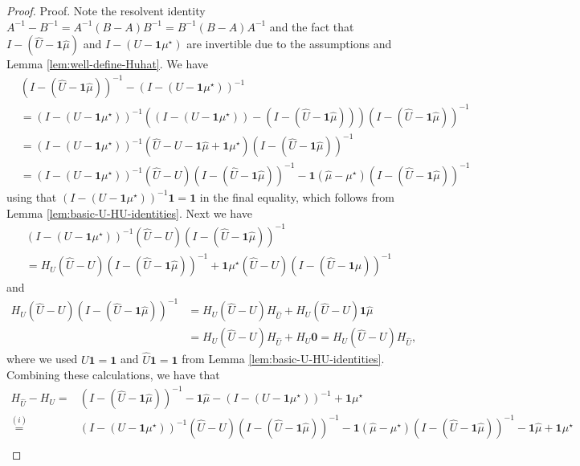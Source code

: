 \documentclass[mnsc,nonblindrev]{informs3}
\newcommand{\one}{\mathbf{1}}
\newcommand{\zero}{\mathbf{0}}
\newcommand{\muhat}{\widehat{\mu}}
\newcommand{\uhat}{\widehat{U}}
\begin{document}
\begin{APPENDICES}
\begin{proof}{Proof.}
    Note the resolvent identity $A^{-1} - B^{-1} = A^{-1}(B-A)B^{-1} = B^{-1} (B-A)A^{-1}$ and the fact that $I - (\uhat - \one \muhat)$ and $I - (U - \one \mu^\star)$ are invertible due to the assumptions and Lemma \ref{lem:well-define-Huhat}. We have
\begin{align}
    & (I - (\uhat - \one \muhat))^{-1}  - (I - (U - \one \mu^\star))^{-1} \nonumber \\
    &= (I - (U - \one \mu^\star))^{-1} \left( (I - (U - \one \mu^\star)) - (I - (\uhat - \one \muhat)) \right) (I - (\uhat - \one \muhat))^{-1}\nonumber \\
    &= (I - (U - \one \mu^\star))^{-1} \left( \uhat - U - \one \muhat + \one \mu^\star \right) (I - (\uhat - \one \muhat))^{-1} \nonumber\\
    &= (I - (U - \one \mu^\star))^{-1} \left( \uhat - U \right) (I - (\uhat - \one \muhat))^{-1} - \one (\muhat - \mu^\star) (I - (\uhat - \one \muhat))^{-1} \label{eq:HU-Huhat_step1}
\end{align}
using that $(I - (U - \one \mu^\star))^{-1} \one = \one$ in the final equality, which follows from Lemma \ref{lem:basic-U-HU-identities}.
Next we have 
\begin{multline}
    (I - (U - \one \mu^\star))^{-1} \left( \uhat - U \right) (I - (\uhat - \one \muhat))^{-1} \\
    = H_U  \left( \uhat - U \right) (I - (\uhat - \one \muhat))^{-1} + \one \mu^\star \left( \uhat - U \right) (I - (\uhat - \one \muhat))^{-1} \label{eq:HU-Huhat_step2}
\end{multline}
and
\begin{align}
    H_U  \left( \uhat - U \right) (I - (\uhat - \one \muhat))^{-1} 
    &= H_U  \left( \uhat - U \right) H_{\uhat}  + H_U  \left( \uhat - U \right) \one \muhat \nonumber\\
    &= H_U  \left( \uhat - U \right) H_{\uhat}  + H_U   \zero 
    = H_U  \left( \uhat - U \right) H_{\uhat}, \label{eq:HU-Huhat_step3}
\end{align}
where we used  $U \one = \one $ and $\uhat \one = \one$ from Lemma \ref{lem:basic-U-HU-identities}.
Combining  these calculations, we have that
\begin{align*}
     H_{\uhat} - H_U 
    =& (I - (\uhat - \one \muhat))^{-1} - \one \muhat  - (I - (U - \one \mu^\star))^{-1} + \one \mu^\star  \\
    \stackrel{(i)}{=}& (I - (U - \one \mu^\star))^{-1} \left( \uhat - U \right) (I - (\uhat - \one \muhat))^{-1} - \one (\muhat - \mu^\star) (I - (\uhat - \one \muhat))^{-1}  - \one \muhat + \one \mu^\star  \\

\end{align*}
\end{proof}
\end{APPENDICES}
\end{document}
